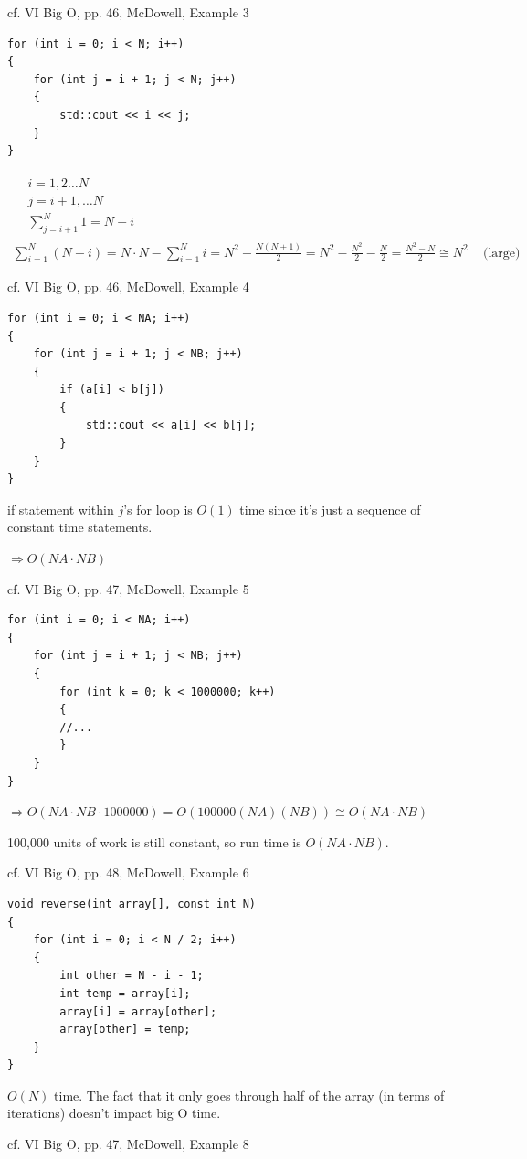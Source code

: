 \documentclass[10pt]{amsart}
\begin{document}
\begin{multicols*}{2}
cf. VI Big O, pp. 46, McDowell, Example 3
\begin{verbatim}
for (int i = 0; i < N; i++)
{
	for (int j = i + 1; j < N; j++)
	{
		std::cout << i << j;
	}
}
\end{verbatim}
\[
\begin{gathered}
	\begin{aligned}
	& i = 1, 2 \dots N \\
	& j = i+1, \dots N \\
	& \sum_{j=i+1}^N 1 = N-i 
	\end{aligned} \\
\sum_{i=1}^N (N-i) = N\cdot N  - \sum_{i=1}^N i = N^2 - \frac{N(N+1)}{2} = N^2 - \frac{N^2}{2} - \frac{N}{2} = \frac{N^2 - N}{2} \cong N^2 \quad \, \text{(large)}
\end{gathered}
\]

cf. VI Big O, pp. 46, McDowell, Example 4
\begin{verbatim}
for (int i = 0; i < NA; i++)
{
	for (int j = i + 1; j < NB; j++)
	{
		if (a[i] < b[j])
		{
			std::cout << a[i] << b[j];
		}
	}
}
\end{verbatim}
if statement within $j$'s for loop is $O(1)$ time since it's just a sequence of constant time statements.

$\Longrightarrow O(NA \cdot NB)$

cf. VI Big O, pp. 47, McDowell, Example 5

\begin{verbatim}
for (int i = 0; i < NA; i++)
{
	for (int j = i + 1; j < NB; j++)
	{
		for (int k = 0; k < 1000000; k++) 
		{
		//...
		}
	}
}
\end{verbatim}

$\Longrightarrow O(NA \cdot NB \cdot 1000000) = O(100000 (NA)(NB)) \cong O(NA\cdot NB)$

100,000 units of work is still constant, so run time is $O(NA\cdot NB)$.

cf. VI Big O, pp. 48, McDowell, Example 6

\begin{verbatim}
void reverse(int array[], const int N)
{
	for (int i = 0; i < N / 2; i++)
	{
		int other = N - i - 1;
		int temp = array[i];
		array[i] = array[other];
		array[other] = temp;
	}
}
\end{verbatim}
$O(N)$ time. The fact that it only goes through half of the array (in terms of iterations) doesn't impact big O time.

cf. VI Big O, pp. 47, McDowell, Example 8


\end{multicols*}
\end{document}
